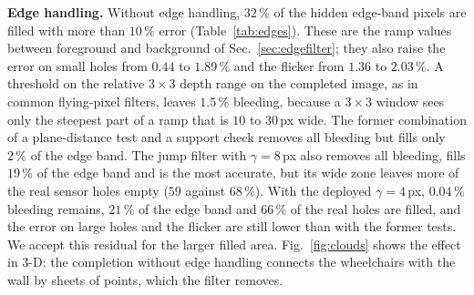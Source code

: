\documentclass[conference]{IEEEtran}
\begin{document}
\textbf{Edge handling.}
\label{sec:res-edges}
Without edge handling, \(32\,\%\) of the hidden edge-band pixels are filled
with more than \(10\,\%\) error (Table~\ref{tab:edges}). These are the ramp
values between foreground and background of Sec.~\ref{sec:edgefilter}; they
also raise the error on small holes from \(0.44\) to \(1.89\,\%\) and the
flicker from \(1.36\) to \(2.03\,\%\). A threshold on the relative \(3{\times}3\)
depth range on the completed image, as in common flying-pixel filters, leaves
\(1.5\,\%\) bleeding, because a \(3{\times}3\) window sees only the steepest
part of a ramp that is \(10\) to \(30\,\)px wide. The former combination of a
plane-distance test and a support check removes all bleeding but fills only
\(2\,\%\) of the edge band. The jump filter with \(\gamma=8\,\)px also removes
all bleeding, fills \(19\,\%\) of the edge band and is the most accurate, but
its wide zone leaves more of the real sensor holes empty (\(59\) against
\(68\,\%\)). With the deployed \(\gamma=4\,\)px, \(0.04\,\%\) bleeding remains,
\(21\,\%\) of the edge band and \(66\,\%\) of the real holes are filled, and the
error on large holes and the flicker are still lower than with the former
tests. We accept this residual for the larger filled area. Fig.~\ref{fig:clouds} shows the
effect in 3-D: the completion without edge handling connects the wheelchairs
with the wall by sheets of points, which the filter removes.

\begin{table}[t]
\centering
\caption{Edge handling with Variant~B (MoGe-2 ViT-B, \(600\) tokens).
Bleeding: fraction of hidden pixels filled with more than \(10\,\%\) error.
Coverage: fraction of hidden pixels that receive a value. Real holes: fraction
of real sensor holes that are filled. Errors below \(3\,\)m. Deployed in bold.}
\label{tab:edges}
\footnotesize
\setlength{\tabcolsep}{2pt}
\end{table}
\end{document}
